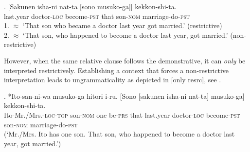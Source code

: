 \exg. [Sakunen isha-ni nat-ta [sono musuko-ga]] kekkon-shi-ta.\\
last.year doctor-\textsc{loc} become-\textsc{pst} that son-\textsc{nom} marriage-do-\textsc{pst}\\
1. $\approx$ `That son who became a doctor last year got married.’ (restrictive) \\
2. $\approx$ `That son, who happened to become a doctor last year, got married.' (non-restrictive) \\ \null \hfill \citep[4, 5]{ishizuka:2008:RC} \label{resrc}

\largerpage[2]
However, when the same relative clause follows the demonstrative, it can \textit{only} be interpreted restrictively. Establishing a context that forces a non-restrictive interpretation leads to ungrammaticality as depicted in \ref{only resrc}, see \citet{ishizuka:2008:RC}.

\exg. *Ito-san-ni-wa musuko-ga hitori i-ru. [Sono [sakunen isha-ni nat-ta] musuko-ga] kekkon-shi-ta.\\
Ito-Mr./Mrs.-\textsc{loc-top} son-\textsc{nom} one be-\textsc{prs} that last.year doctor-\textsc{loc} become-\textsc{pst} son-\textsc{nom} marriage-do-\textsc{pst}\\
(`Mr./Mrs. Ito has one son. That son, who happened to become a doctor last year, got married.’) \\ \null \hfill \citep[5]{ishizuka:2008:RC} \label{only resrc}

